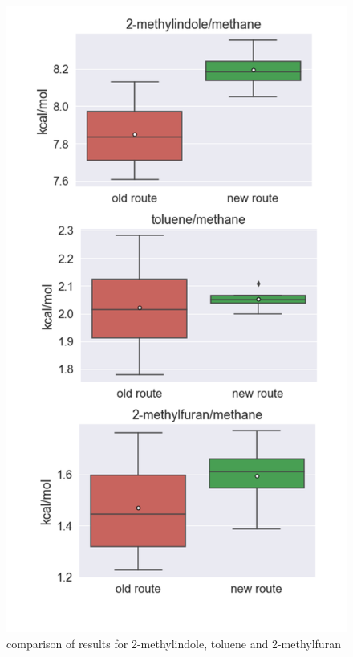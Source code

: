\begin{figure}
	
	\includegraphics[scale=0.65]{results_3pairs1}
	\caption{comparison of results for 2-methylindole, toluene and 2-methylfuran}
	\label{fig:boxplot_small}
\end{figure}


